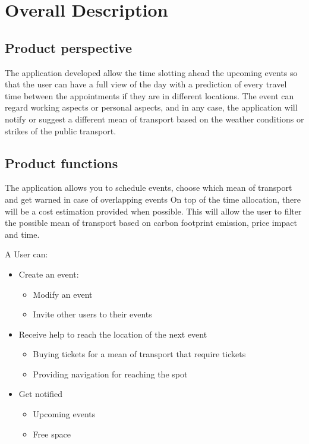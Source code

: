 \chapter{Overall Description}
\label{cha:desc}

\section{Product perspective}
\label{sec:productperspective}
The application developed allow the time slotting ahead the upcoming events so that the user can have a full view of the day with a prediction of every travel time between the appointments if they are in different locations.
The event can regard working aspects or personal aspects, and in any case, the application will notify or suggest a different mean of transport based on the weather conditions or strikes of the public transport.


\section{Product functions}
\label{sec:productfunctions}
The application allows you to schedule events, choose which mean of transport and get warned in case of overlapping events
On top of the time allocation, there will be a cost estimation provided when possible. 
This will allow the user to filter the possible mean of transport based on carbon footprint emission, price impact and time.

A User can:
\begin{itemize}
\item Create an event:
\begin{itemize}
\item Modify an event
\item Invite other users to their events
\end{itemize}
\item Receive help to reach the location of the next event
\begin{itemize}
\item Buying tickets for a mean of transport that require tickets
\item Providing navigation for reaching the spot 
\end{itemize}
\end{itemize}
\begin{itemize}
\item Get notified
\begin{itemize}
\item Upcoming events
\item Free space
\end{itemize}
\end{itemize}

